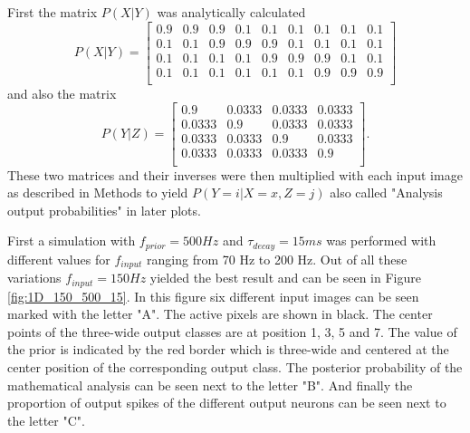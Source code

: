 First the matrix $P(X|Y)$ was analytically calculated 
\begin{equation}
\label{eqn:pXvorausgesetztY}
P(X|Y) = \begin{bmatrix}
0.9 & 0.9 & 0.9 & 0.1 & 0.1 & 0.1 & 0.1 & 0.1 & 0.1\\
0.1 & 0.1 & 0.9 & 0.9 & 0.9 & 0.1 & 0.1 & 0.1 & 0.1\\
0.1 & 0.1 & 0.1 & 0.1 & 0.9 & 0.9 & 0.9 & 0.1 & 0.1\\
0.1 & 0.1 & 0.1 & 0.1 & 0.1 & 0.1 & 0.9 & 0.9 & 0.9\\
\end{bmatrix}
\end{equation}
and also the matrix
\begin{equation}
\label{eqn:pXvorausgesetztY}
P(Y|Z) = \begin{bmatrix}
0.9 & 0.0333 & 0.0333 & 0.0333\\
0.0333 & 0.9 & 0.0333 & 0.0333\\
0.0333 & 0.0333 & 0.9 & 0.0333\\
0.0333 & 0.0333 & 0.0333 & 0.9\\
\end{bmatrix}.
\end{equation} 
These two matrices and their inverses were then multiplied with each input image as described in Methods to yield $P(Y = i|X = x, Z = j)$ also called "Analysis output probabilities" in later plots.

First a simulation with $f_{prior} = 500 Hz$ and $\tau_{decay} = 15 ms$ was performed with different values for $f_{input}$ ranging from 70 Hz to 200 Hz. Out of all these variations $f_{input} = 150 Hz$ yielded the best result and can be seen in Figure \ref{fig:1D_150_500_15}. In this figure six different input images can be seen marked with the letter "A". The active pixels are shown in black. The center points of the three-wide output classes are at position 1, 3, 5 and 7. The value of the prior is indicated by the red border which is three-wide and centered at the center position of the corresponding output class. The posterior probability of the mathematical analysis can be seen next to the letter "B". And finally the proportion of output spikes of the different output neurons can be seen next to the letter "C".

